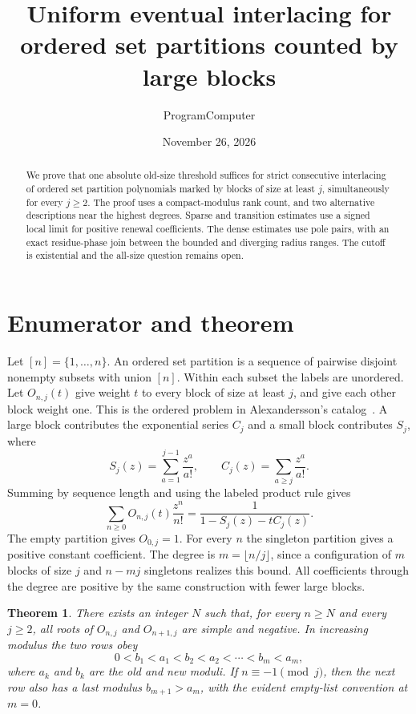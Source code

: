 \documentclass[11pt]{article}
\title{Uniform eventual interlacing for ordered set partitions counted by large blocks}
\author{ProgramComputer}
\date{November 26, 2026}
\newtheorem{theorem}{Theorem}
\begin{document}
\maketitle

\begin{abstract}
We prove that one absolute old-size threshold suffices for strict consecutive interlacing of ordered set partition polynomials marked by blocks of size at least \(j\), simultaneously for every \(j\ge2\). The proof uses a compact-modulus rank count, and two alternative descriptions near the highest degrees. Sparse and transition estimates use a signed local limit for positive renewal coefficients. The dense estimates use pole pairs, with an exact residue-phase join between the bounded and diverging radius ranges. The cutoff is existential and the all-size question remains open.
\end{abstract}

\section{Enumerator and theorem}
Let \([n]=\{1,\ldots,n\}\). An ordered set partition is a sequence of pairwise disjoint nonempty subsets with union \([n]\). Within each subset the labels are unordered. Let \(O_{n,j}(t)\) give weight \(t\) to every block of size at least \(j\), and give each other block weight one. This is the ordered problem in Alexandersson's catalog~\cite{alex}. A large block contributes the exponential series \(C_j\) and a small block contributes \(S_j\), where
\[
 S_j(z)=\sum_{a=1}^{j-1}\frac{z^a}{a!},
 \qquad C_j(z)=\sum_{a\ge j}\frac{z^a}{a!}.
\]
Summing by sequence length and using the labeled product rule gives
\begin{equation}
 \sum_{n\ge0} O_{n,j}(t)\frac{z^n}{n!}
   =\frac{1}{1-S_j(z)-t C_j(z)}.\label{eq:egf}
\end{equation}
The empty partition gives \(O_{0,j}=1\). For every \(n\) the singleton partition gives a positive constant coefficient. The degree is \(m=\lfloor n/j\rfloor\), since a configuration of \(m\) blocks of size \(j\) and \(n-mj\) singletons realizes this bound. All coefficients through the degree are positive by the same construction with fewer large blocks.

\begin{theorem}\label{thm:main}
There exists an integer \(N\) such that, for every \(n\ge N\) and every \(j\ge2\), all roots of \(O_{n,j}\) and \(O_{n+1,j}\) are simple and negative. In increasing modulus the two rows obey
\[
 0<b_1<a_1<b_2<a_2<\cdots<b_m<a_m,
\]
where \(a_k\) and \(b_k\) are the old and new moduli. If \(n\equiv-1\pmod j\), then the next row also has a last modulus \(b_{m+1}>a_m\), with the evident empty-list convention at \(m=0\).
\end{theorem}
\end{document}
